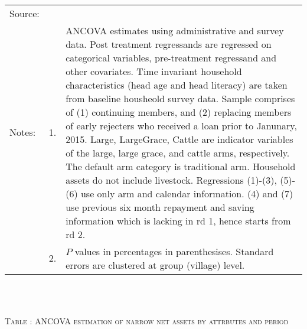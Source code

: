 \begin{minipage}[t]{14cm}
  \setlength{\baselineskip}{8pt}
  \renewcommand{\arraystretch}{.55}
  \hfil{}\\
\renewcommand{\arraystretch}{.8}
\setlength{\tabcolsep}{1pt} \begin{tabular}{>{\hfill\scriptsize}p{1cm}<{}>{\hfill\scriptsize}p{.25cm}<{}>{\scriptsize}p{12cm}<{\hfill}} 
Source:& \multicolumn{2}{l}{\scriptsize Estimated with GUK administrative and survey data.}\\
Notes: & 1. & ANCOVA estimates using administrative and survey data. Post treatment regressands are regressed on categorical variables, pre-treatment regressand and other covariates. Time invariant household characteristics (head age and head literacy) are taken from baseline housheold survey data. Sample comprises of (1) continuing members, and (2) replacing members of early rejecters who received a loan prior to Janunary, 2015.  \textsf{Large}, \textsf{LargeGrace}, \textsf{Cattle} are indicator variables of the \textsf{large}, \textsf{large grace}, and \textsf{cattle} arms, respectively. The default arm category is \textsf{traditional} arm. Household assets do not include livestock. Regressions (1)-(3), (5)-(6) use only arm and calendar information. (4) and (7) use previous six month repayment and saving information which is lacking in rd 1, hence starts from rd 2.\\
& 2. &  $P$ values in percentages in parenthesises. Standard errors are clustered at group (village) level. %
 \end{tabular}
\end{minipage} \\\\\hspace{-1cm}\begin{minipage}[t]{14cm} \hfil\textsc{\normalsize Table \thetable: ANCOVA estimation of narrow net assets by attrbutes and period\label{tab ANCOVA narrow net assets timevarying attributes}}\\ \setlength{\tabcolsep}{1pt}
  \setlength{\baselineskip}{8pt}
  \renewcommand{\arraystretch}{.55}
  \hfil\begin{tikzpicture}

\end{tikzpicture}
\end{minipage}
